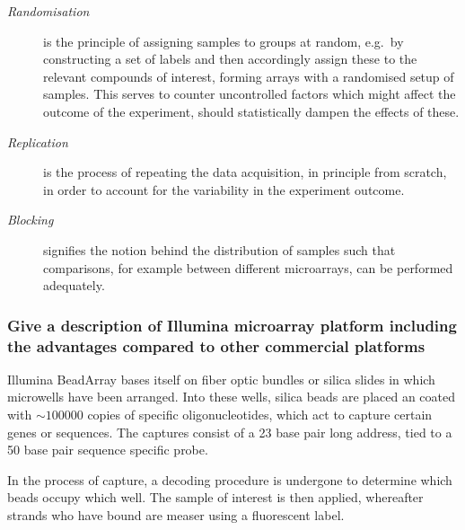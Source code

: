 \documentclass[10pt]{article}\usepackage[]{graphicx}\usepackage[]{color}
\theoremstyle{plain}
\theoremstyle{definition}
\begin{document}
\begin{description}

\item[\emph{Randomisation}] is the principle of assigning samples to groups at random, e.g.\ by constructing a set of labels and then accordingly assign these to the relevant compounds of interest, forming arrays with a randomised setup of samples. This serves to counter uncontrolled factors which might affect the outcome of the experiment, should statistically dampen the effects of these.

\item[\emph{Replication}] is the process of repeating the data acquisition, in principle from scratch, in order to account for the variability in the experiment outcome. 

\item[\emph{Blocking}] signifies the notion behind the distribution of samples such that comparisons, for example between different microarrays, can be performed adequately.  

\end{description}


\subsubsection*{Give a description of Illumina microarray platform including the
advantages compared to other commercial platforms}

Illumina BeadArray bases itself on fiber optic bundles or silica slides in which microwells have been arranged. Into these wells, silica beads are placed an coated with $\sim 100000$ copies of specific oligonucleotides, which act to capture certain genes or sequences. The captures consist of a 23 base pair long address, tied to a 50 base pair sequence specific probe.

In the process of capture, a decoding procedure is undergone to determine which beads occupy which well. The sample of interest is then applied, whereafter strands who have bound are measer using a fluorescent label. 
\end{document}
